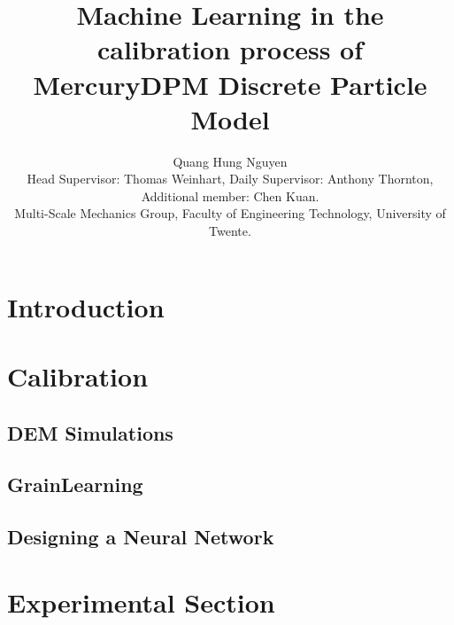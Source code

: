\documentclass{article}
\title{Machine Learning in the calibration process of MercuryDPM Discrete Particle Model}
\author{Quang Hung Nguyen\\[1ex] \small Head Supervisor: Thomas Weinhart, Daily Supervisor: Anthony Thornton, Additional member: Chen Kuan. \\
\small Multi-Scale Mechanics Group, Faculty of Engineering Technology, University of Twente.}
\date{}
\begin{document}
\maketitle

\section{Introduction}





% 


% 



\section{Calibration}
\subsection{DEM Simulations}


\subsection{GrainLearning}


\subsection{Designing a Neural Network}


\section{Experimental Section}


\pagebreak  


\end{document}
